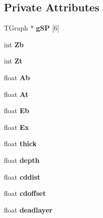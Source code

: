 \subsection*{Private Attributes}
\begin{DoxyCompactItemize}
\item 
\mbox{\label{classdoppler_a68aa6852863cc61aac4b48232984d9e3}} 
T\+Graph $\ast$ {\bfseries g\+SP} \mbox{[}6\mbox{]}
\item 
\mbox{\label{classdoppler_a9d471fcad9598fd2ade30e33fa975a68}} 
int {\bfseries Zb}
\item 
\mbox{\label{classdoppler_af8a5a56a1df23ebbad07fc02dc769301}} 
int {\bfseries Zt}
\item 
\mbox{\label{classdoppler_a5cade73bdf88628d2249fe132fafa09d}} 
float {\bfseries Ab}
\item 
\mbox{\label{classdoppler_a74c6dbe49c10b46c6a7359d63bb2de70}} 
float {\bfseries At}
\item 
\mbox{\label{classdoppler_a9a878a5ca9fc4137f5947bb92d7425c2}} 
float {\bfseries Eb}
\item 
\mbox{\label{classdoppler_a98c25c360b741e6974ed025c4729a99e}} 
float {\bfseries Ex}
\item 
\mbox{\label{classdoppler_ae033bed03e9914f81466554748fb8f52}} 
float {\bfseries thick}
\item 
\mbox{\label{classdoppler_ac238412e666b74f8e087841d74ba29d9}} 
float {\bfseries depth}
\item 
\mbox{\label{classdoppler_ab7b2d87bd7a05a73cc01c26d76e8cd93}} 
float {\bfseries cddist}
\item 
\mbox{\label{classdoppler_ade25af8752bc9c54cfb04a1c444f2be6}} 
float {\bfseries cdoffset}
\item 
\mbox{\label{classdoppler_a09bc0cdb38a83eaa1e9d1d3e34c6e5cc}} 
float {\bfseries deadlayer}

\end{DoxyCompactItemize}
